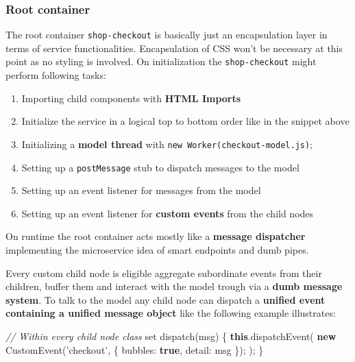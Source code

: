 \documentclass[]{article}
\newenvironment{Shaded}{}{}
\newcommand{\KeywordTok}[1]{\textcolor[rgb]{0.00,0.44,0.13}{\textbf{{#1}}}}
\newcommand{\DataTypeTok}[1]{\textcolor[rgb]{0.56,0.13,0.00}{{#1}}}
\newcommand{\StringTok}[1]{\textcolor[rgb]{0.25,0.44,0.63}{{#1}}}
\newcommand{\CommentTok}[1]{\textcolor[rgb]{0.38,0.63,0.69}{\textit{{#1}}}}
\newcommand{\OperatorTok}[1]{\textcolor[rgb]{0.40,0.40,0.40}{{#1}}}
\newcommand{\AttributeTok}[1]{\textcolor[rgb]{0.49,0.56,0.16}{{#1}}}
\newcommand{\NormalTok}[1]{{#1}}
\providecommand{\tightlist}{%
  \setlength{\itemsep}{0pt}\setlength{\parskip}{0pt}}
\begin{document}
\subsubsection{Root container}\label{root-container}

The root container \texttt{shop-checkout} is basically just an
encapsulation layer in terms of service functionalities. Encapsulation
of CSS won't be necessary at this point as no styling is involved. On
initialization the \texttt{shop-checkout} might perform following tasks:

\begin{enumerate}
\def\labelenumi{\arabic{enumi}.}
\tightlist
\item
  Importing child components with \textbf{HTML Imports}
\item
  Initialize the service in a logical top to bottom order like in the
  snippet above
\item
  Initializing a \textbf{model thread} with
  \texttt{new\ Worker(\textquotesingle{}checkout-model.js\textquotesingle{})};
\item
  Setting up a \texttt{postMessage} stub to dispatch messages to the
  model
\item
  Setting up an event listener for messages from the model
\item
  Setting up an event listener for \textbf{custom events} from the child
  nodes
\end{enumerate}

On runtime the root container acts mostly like a \textbf{message
dispatcher} implementing the microservice idea of smart endpoints and
dumb pipes.

Every custom child node is eligible aggregate subordinate events from
their children, buffer them and interact with the model trough via a
\textbf{dumb message system}. To talk to the model any child node can
dispatch a \textbf{unified event containing a unified message object}
like the following example illustrates:

\begin{Shaded}
\begin{Highlighting}[]
\CommentTok{// Within every child node class}
\NormalTok{set }\AttributeTok{dispatch}\NormalTok{(msg) }\OperatorTok{\{}
  \KeywordTok{this}\NormalTok{.}\AttributeTok{dispatchEvent}\NormalTok{(}
    \KeywordTok{new} \AttributeTok{CustomEvent}\NormalTok{(}\StringTok{'checkout'}\OperatorTok{,} \OperatorTok{\{}
      \DataTypeTok{bubbles}\OperatorTok{:} \KeywordTok{true}\OperatorTok{,}
      \DataTypeTok{detail}\OperatorTok{:} \NormalTok{msg}
    \OperatorTok{\}}\NormalTok{)}\OperatorTok{;}
  \NormalTok{)}\OperatorTok{;}
\OperatorTok{\}}
\end{Highlighting}
\end{Shaded}
\end{document}
